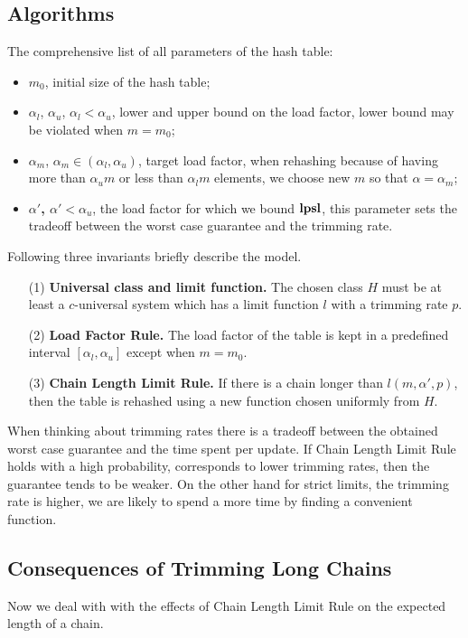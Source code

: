 \subsection{Algorithms}
The comprehensive list of all parameters of the hash table:
\begin{itemize}
	\item {$m_0$}, initial size of the hash table;
	\item {$\alpha_l$, $\alpha_u$, $\alpha_l < \alpha_u$}, lower and upper bound on the load factor, lower bound may be violated when $m = m_0$;
	\item {$\alpha_m$, $\alpha_m \in (\alpha_l, \alpha_u)$}, target load factor, when rehashing because of having more than $\alpha_u m$ or less than $\alpha_l m$ elements, we choose new $m$ so that $\alpha = \alpha_m$;
	\item \textbf{$\alpha'$, $\alpha' < \alpha_u$}, the load factor for which we bound $\mathbf{lpsl}$, this parameter sets the tradeoff between the worst case guarantee and the trimming rate.
\end{itemize}
Following three invariants briefly describe the model. 
\begin{itemize}
\item[(1)] \textbf{Universal class and limit function.} The chosen class $H$ must be at least a $c$-universal system which has a limit function $l$ with a trimming rate $p$.
\item[(2)] \textbf{Load Factor Rule.} The load factor of the table is kept in a predefined interval $[\alpha_l, \alpha_u]$ except when $m = m_0$.
\item[(3)] \textbf{Chain Length Limit Rule.} If there is a chain longer than $l(m, \alpha', p)$, then the table is rehashed using a new function chosen uniformly from $H$.
\end{itemize}

When thinking about trimming rates there is a tradeoff between the obtained worst case guarantee and the time spent per update.
If Chain Length Limit Rule holds with a high probability, corresponds to lower trimming rates, then the guarantee tends to be weaker. 
On the other hand for strict limits, the trimming rate is higher, we are likely to spend a more time by finding a convenient function.



\subsection{Consequences of Trimming Long Chains}
Now we deal with with the effects of Chain Length Limit Rule on the expected length of a chain.


